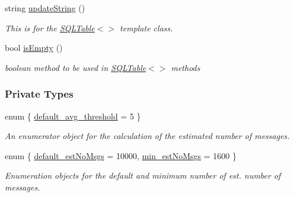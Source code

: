 \begin{CompactItemize}
string \hyperlink{classDay_Daya14}{update\-String} ()
\begin{CompactList}\small\item\em This is for the \hyperlink{classSQLTable}{SQLTable}$<$$>$ template class.\item\end{CompactList}\item 
bool \hyperlink{classDay_Daya15}{is\-Empty} ()
\begin{CompactList}\small\item\em boolean method to be used in \hyperlink{classSQLTable}{SQLTable}$<$$>$ methods\item\end{CompactList}\end{CompactItemize}
\subsubsection*{Private Types}
\begin{CompactItemize}
\item 
enum \{ \hyperlink{classDay_Dayu3Dayu0}{default\_\-avg\_\-threshold} =  5
 \}
\begin{CompactList}\small\item\em An enumerator object for the calculation of the estimated number of messages.\item\end{CompactList}\item 
enum \{ \hyperlink{classDay_Dayu4Dayu1}{default\_\-est\-No\-Msgs} =  10000, 
\hyperlink{classDay_Dayu4Dayu2}{min\_\-est\-No\-Msgs} =  1600
 \}
\begin{CompactList}\small\item\em Enumeration objects for the default and minimum number of est. number of messages.\item\end{CompactList}\end{CompactItemize}
